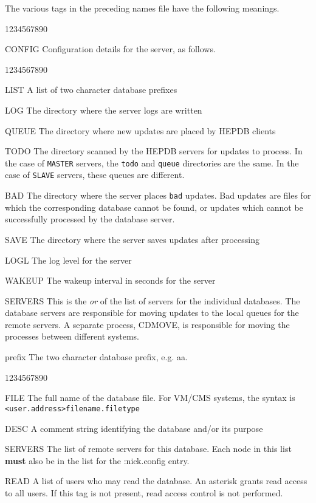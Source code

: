 The various tags in the preceding names file have the following meanings.
\begin{DLtt}{1234567890}
\item[CONFIG]Configuration details for the server, as follows.
\begin{DLtt}{1234567890}
\item[LIST]A list of two character database prefixes
\item[LOG]The directory where the server logs are written
\item[QUEUE]The directory where new updates are placed by HEPDB clients
\item[TODO]The directory scanned by the HEPDB servers for updates to
process. In the case of {\tt MASTER} servers, the {\tt todo}
and {\tt queue} directories are the same. In the case of {\tt SLAVE}
servers, these queues are different.
\item[BAD]The directory where the server places {\tt bad} updates.
Bad updates are files for which the corresponding database cannot be
found, or updates which cannot be successfully processed by the
database server.
\item[SAVE]The directory where the server saves updates after processing
\item[LOGL]The log level for the server
\item[WAKEUP]The wakeup interval in seconds for the server
\item[SERVERS]This is the {\it or} of the list of servers for the
individual databases. The database servers are responsible for
moving updates to the local queues for the remote servers. A separate
process, CDMOVE, is responsible for moving the processes between different
systems.
\end{DLtt}
\item[prefix]The two character database prefix, e.g. {\Lit aa}.
\begin{DLtt}{1234567890}
\item[FILE]The full name of the database file. For VM/CMS systems,
the syntax is {\tt <user.address>filename.filetype}
\item[DESC]A comment string identifying the database and/or its purpose
\item[SERVERS]The list of remote servers for this database. Each node
in this list {\bf must} also be in the list for the :nick.config entry.
\item[READ]A list of users who may read the database. An asterisk
grants read access to all users. If this tag is not present,
read access control is not performed.

\end{DLtt}
\end{DLtt}
